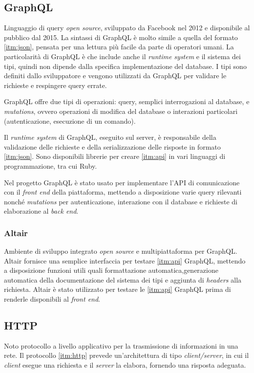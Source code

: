 \subsection{GraphQL}
Linguaggio di query \textit{open source}, sviluppato da Facebook nel 2012 e disponibile al pubblico dal 2015. La sintassi di GraphQL è molto simile a quella del formato \ref{itm:json}, pensata per una lettura più facile da parte di operatori umani. La particolarità di GraphQL è che include anche il \textit{runtime system} e il sistema dei tipi, quindi non dipende dalla specifica implementazione del database. I tipi sono definiti dallo sviluppatore e vengono utilizzati da GraphQL per validare le richieste e respingere query errate.

GraphQL offre due tipi di operazioni: query, semplici interrogazioni al database, e \textit{mutations}, ovvero operazioni di modifica del database o interazioni particolari (autenticazione, esecuzione di un comando).

Il \textit{runtime system} di GraphQL, eseguito sul server, è responsabile della validazione delle richieste e della serializzazione delle risposte in formato \ref{itm:json}. Sono disponibili librerie per creare \ref{itm:api} in vari linguaggi di programmazione, tra cui Ruby.

Nel progetto GraphQL è stato usato per implementare l'API di comunicazione con il \textit{front end} della piattaforma, mettendo a disposizione varie query rilevanti nonché \textit{mutations} per autenticazione, interazione con il database e richieste di elaborazione al \textit{back end}.

\subsubsection{Altair}
Ambiente di sviluppo integrato \textit{open source} e multipiattaforma per GraphQL. Altair fornisce una semplice interfaccia per testare \ref{itm:api} GraphQL, mettendo a disposizione funzioni utili quali  formattazione automatica,generazione automatica della documentazione del sistema dei tipi e aggiunta di \textit{headers} alla richiesta. Altair è stato utilizzato per testare le \ref{itm:api} GraphQL prima di renderle disponibili al \textit{front end}.

\subsection{HTTP}
Noto protocollo a livello applicativo per la trasmissione di informazioni in una rete. Il protocollo \ref{itm:http} prevede un'architettura di tipo \textit{client/server}, in cui il \textit{client} esegue una richiesta e il \textit{server} la elabora, fornendo una risposta adeguata.

